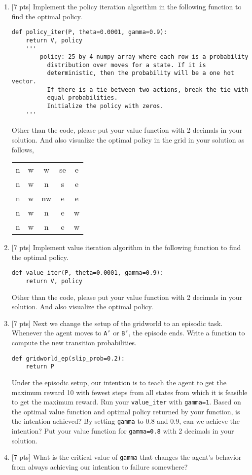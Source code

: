 \begin{enumerate}
    \item{}[7 pts] Implement the policy iteration algorithm in the following
    function to find the optimal policy.
    \begin{verbatim}
def policy_iter(P, theta=0.0001, gamma=0.9):
    return V, policy
    '''
        policy: 25 by 4 numpy array where each row is a probability
          distribution over moves for a state. If it is
          deterministic, then the probability will be a one hot vector.
          If there is a tie between two actions, break the tie with
          equal probabilities.
          Initialize the policy with zeros.
    '''
    \end{verbatim}
    Other than the code, please put your value function with 2 decimals
    in your solution. And also visualize the optimal policy in
    the grid in your solution as follows,
    \begin{tabular}{ccccc}
      n & w & w & se & e \\
      n & w & n & s & e \\
      n & w & nw & e & e \\
      n & w & n & e & w \\
      n & w & n & e & w \\
    \end{tabular}

    \item{}[7 pts] Implement value iteration algorithm in the following
    function to find the optimal policy.
    \begin{verbatim}
def value_iter(P, theta=0.0001, gamma=0.9):
    return V, policy
    \end{verbatim}
    Other than the code, please put your value function with 2 decimals
    in your solution. And also visualize the optimal policy.

    \item{}[7 pts] Next we change the setup of the gridworld to an episodic task.
    Whenever the agent moves to \texttt{A'} or \texttt{B'}, the episode ends.
    Write a function to compute the new transition probabilities.
    \begin{verbatim}
def gridworld_ep(slip_prob=0.2):
    return P
    \end{verbatim}
    Under the episodic setup, our intention is to teach the agent to get the
    maximum reward 10 with fewest steps from all states from which it is
    feasible to get the maximum reward. Run your \texttt{value\_iter} with
    \texttt{gamma=1}. Based on the optimal value function and optimal policy returned by your
    function, is the intention achieved?
    By setting \texttt{gamma} to 0.8 and 0.9, can we achieve the intention?
    Put your value function for \texttt{gamma=0.8} with 2 decimals in your
    solution.

    \item{}[7 pts] What is the critical value of \texttt{gamma} that changes the agent's
    behavior from always achieving our intention to failure somewhere? 
\end{enumerate}
